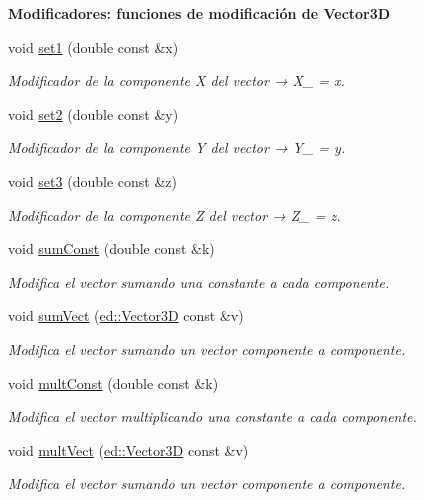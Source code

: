 \begin{Indent}\textbf{ Modificadores\+: funciones de modificación de Vector3D}\par
\begin{DoxyCompactItemize}
\item 
void \mbox{\hyperlink{classed_1_1Vector3D_acfdf541551fe60c3d01f4415989f20c2}{set1}} (double const \&x)
\begin{DoxyCompactList}\small\item\em Modificador de la componente X del vector → X\+\_\+ = x. \end{DoxyCompactList}\item 
void \mbox{\hyperlink{classed_1_1Vector3D_a9148554ef7b54d5f06f1938791ff9e6a}{set2}} (double const \&y)
\begin{DoxyCompactList}\small\item\em Modificador de la componente Y del vector → Y\+\_\+ = y. \end{DoxyCompactList}\item 
void \mbox{\hyperlink{classed_1_1Vector3D_a6c658249a001608a6e8c8e8e249d3fb3}{set3}} (double const \&z)
\begin{DoxyCompactList}\small\item\em Modificador de la componente Z del vector → Z\+\_\+ = z. \end{DoxyCompactList}\item 
void \mbox{\hyperlink{classed_1_1Vector3D_a38a5c63c2926e9685d040eab39e23c60}{sum\+Const}} (double const \&k)
\begin{DoxyCompactList}\small\item\em Modifica el vector sumando una constante a cada componente. \end{DoxyCompactList}\item 
void \mbox{\hyperlink{classed_1_1Vector3D_a1b33db7851b02ee4a00aee17262af20a}{sum\+Vect}} (\mbox{\hyperlink{classed_1_1Vector3D}{ed\+::\+Vector3D}} const \&v)
\begin{DoxyCompactList}\small\item\em Modifica el vector sumando un vector componente a componente. \end{DoxyCompactList}\item 
void \mbox{\hyperlink{classed_1_1Vector3D_a02b35a0d961ae10123be25aa6d62f554}{mult\+Const}} (double const \&k)
\begin{DoxyCompactList}\small\item\em Modifica el vector multiplicando una constante a cada componente. \end{DoxyCompactList}\item 
void \mbox{\hyperlink{classed_1_1Vector3D_aea173ccbe7eb56fae15e6c64c693f9f4}{mult\+Vect}} (\mbox{\hyperlink{classed_1_1Vector3D}{ed\+::\+Vector3D}} const \&v)
\begin{DoxyCompactList}\small\item\em Modifica el vector sumando un vector componente a componente. \end{DoxyCompactList}\end{DoxyCompactItemize}
\end{Indent}
